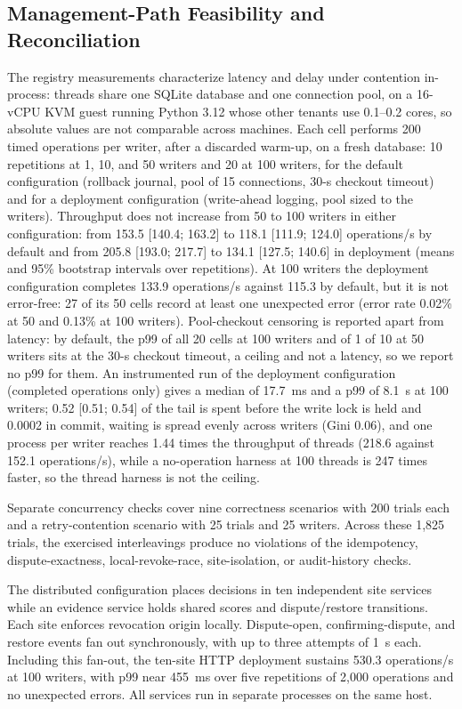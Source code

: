 \documentclass[journal]{IEEEtran}
\theoremstyle{definition}
\begin{document}
\subsection{Management-Path Feasibility and Reconciliation}
\label{sec:scalability-results}
The registry measurements characterize latency and delay under contention in-process: threads share one SQLite database and one connection pool, on a 16-vCPU KVM guest running Python 3.12 whose other tenants use 0.1--0.2 cores, so absolute values are not comparable across machines. Each cell performs 200 timed operations per writer, after a discarded warm-up, on a fresh database: 10 repetitions at 1, 10, and 50 writers and 20 at 100 writers, for the default configuration (rollback journal, pool of 15 connections, 30-s checkout timeout) and for a deployment configuration (write-ahead logging, pool sized to the writers). Throughput does not increase from 50 to 100 writers in either configuration: from 153.5 [140.4; 163.2] to 118.1 [111.9; 124.0] operations/s by default and from 205.8 [193.0; 217.7] to 134.1 [127.5; 140.6] in deployment (means and 95\% bootstrap intervals over repetitions). At 100 writers the deployment configuration completes 133.9 operations/s against 115.3 by default, but it is not error-free: 27 of its 50 cells record at least one unexpected error (error rate 0.02\% at 50 and 0.13\% at 100 writers). Pool-checkout censoring is reported apart from latency: by default, the p99 of all 20 cells at 100 writers and of 1 of 10 at 50 writers sits at the 30-s checkout timeout, a ceiling and not a latency, so we report no p99 for them. An instrumented run of the deployment configuration (completed operations only) gives a median of 17.7~ms and a p99 of 8.1~s at 100 writers; 0.52 [0.51; 0.54] of the tail is spent before the write lock is held and 0.0002 in commit, waiting is spread evenly across writers (Gini 0.06), and one process per writer reaches 1.44 times the throughput of threads (218.6 against 152.1 operations/s), while a no-operation harness at 100 threads is 247 times faster, so the thread harness is not the ceiling.

Separate concurrency checks cover nine correctness scenarios with 200 trials each and a retry-contention scenario with 25 trials and 25 writers. Across these 1,825 trials, the exercised interleavings produce no violations of the idempotency, dispute-exactness, local-revoke-race, site-isolation, or audit-history checks.

The distributed configuration places decisions in ten independent site services while an evidence service holds shared scores and dispute/restore transitions. Each site enforces revocation origin locally. Dispute-open, confirming-dispute, and restore events fan out synchronously, with up to three attempts of 1~s each. Including this fan-out, the ten-site HTTP deployment sustains 530.3 operations/s at 100 writers, with p99 near 455~ms over five repetitions of 2,000 operations and no unexpected errors. All services run in separate processes on the same host.
\end{document}
